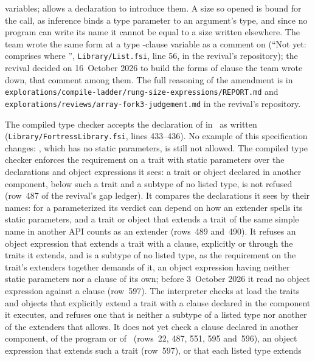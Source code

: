 \begin{description}
variables;  allows a declaration to introduce them.
A size so opened is bound for the call, as inference binds a type parameter
to an argument's type, and since no program can write its name it cannot be
equal to a size written elsewhere.
The team wrote the same form at a type -clause variable as a comment
on  (``Not yet: comprises
 where '',
\nolinkurl{Library/List.fsi}, line 56, in the revival's repository); the
revival decided on 16~October 2026 to build the forms of  clause the
team wrote down, that comment among them.
The full reasoning of the amendment is in
\nolinkurl{explorations/compile-ladder/rung-size-expressions/REPORT.md} and
\nolinkurl{explorations/reviews/array-fork3-judgement.md} in the revival's
repository.
\item[Effect] The compiled type checker accepts the declaration of
 in \library\ as written
(\nolinkurl{Library/FortressLibrary.fsi}, lines 433--436).
No example of this specification changes: , which
has no static parameters, is still not allowed.
The compiled type checker enforces the requirement on a trait with static
parameters over the declarations and object expressions it sees: a trait or object declared in
another component, below such a trait and a subtype of no listed type, is
not refused (row~487 of the revival's gap ledger). It compares the declarations it sees by their names: for a parameterized  its verdict can depend on how an extender spells its static parameters, and a trait or object that extends a trait of the same simple name in another API counts as an extender (rows~489 and~490).
It refuses an object expression that extends a trait with a 
clause, explicitly or through the traits it extends, and is a subtype of no
listed type, as the requirement on the trait's extenders together demands of
it, an object expression having neither static parameters nor a clause of its
own; before 3~October 2026 it read no object expression against a clause
(row~597).
The interpreter checks at load the traits and objects that explicitly extend a
trait with a  clause declared in the component it executes, and
refuses one that is neither a subtype of a listed type nor another of the
extenders that  allows.
It does not yet check a clause declared in another component, of the program
or of \library\ (rows~22, 487, 551, 595 and~596), an object expression that
extends such a trait (row~597), or that each listed type extends 

\end{description}
